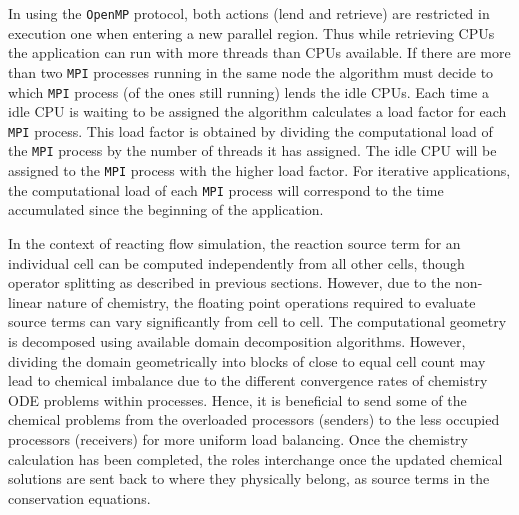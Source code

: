 \documentclass[letterpaper,twocolumn,10pt]{article}
\begin{document}
In using the \texttt{OpenMP} protocol, both actions (lend and retrieve) are restricted in execution one when entering a new parallel region. Thus while retrieving CPUs the application can run with more threads than CPUs available. If there are more than two \texttt{MPI} processes running in the same node the algorithm must decide to which \texttt{MPI} process (of the ones still running) lends the idle CPUs. Each time a idle CPU is waiting to be assigned the algorithm calculates a load factor for each \texttt{MPI} process. This load factor is obtained by dividing the computational load of the \texttt{MPI} process by the number of threads it has assigned. The idle CPU will be assigned to the \texttt{MPI} process with the higher load factor. For iterative applications, the computational load of each \texttt{MPI} process will correspond to the time accumulated since the beginning of the application.

In the context of reacting flow simulation, the reaction source term for an individual cell can be computed independently from all other cells, though operator splitting as described in previous sections. However, due to the non-linear nature of chemistry, the floating point operations required to evaluate source terms can vary significantly from cell to cell. The computational geometry is decomposed using available domain decomposition algorithms. However, dividing the domain geometrically into blocks of close to equal cell count may lead to chemical imbalance due to the different convergence rates of chemistry ODE problems within processes. Hence, it is beneficial to send some of the chemical problems from the overloaded processors (senders) to the less occupied processors (receivers) for more uniform load balancing. Once the chemistry calculation has been completed, the roles interchange once the updated chemical solutions are sent back to where they physically belong, as source terms in the conservation equations.
\end{document}
